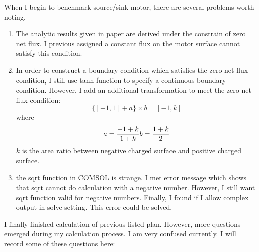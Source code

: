 \documentclass[fontsize=11pt, %
                             paper=a4, %
                             twoside, %
                             captions=tableheading,
                             index=totoc,
                             hyperref]{labbook}
\begin{document}
When I begin to benchmark source/sink motor, there are several problems worth noting.
\begin{enumerate}
\item
The analytic results given in paper\cite{Nourhani2016} are derived under the constrain of zero net flux. I previous assigned a constant flux on the motor surface cannot satisfy this condition.
\item
In order to construct a boundary condition which satisfies the zero net flux condition, I still use tanh function to specify a continuous boundary condition. However, I add an additional transformation to meet the zero net flux condition:
\begin{equation}
\{[-1,1]+a\}\times b=[-1,k]
\end{equation}
where
\begin{equation}
a=\frac{-1+k}{1+k}\\
b=\frac{1+k}{2}
\end{equation}
$k$ is the area ratio between negative charged surface and positive charged surface.
\item
the sqrt function in COMSOL is strange. I met error message which shows that sqrt cannot do calculation with a negative number. However, I still want sqrt function valid for negative numbers. Finally, I found if I allow complex output in solve setting. This error could be solved.
\end{enumerate}
I finally finished calculation of previous listed plan. However, more questions emerged during my calculation process. I am very confused currently. I will record some of these questions here:
\end{document}
